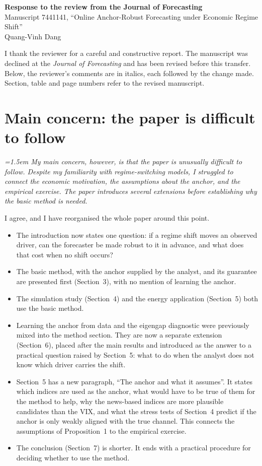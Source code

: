 \documentclass[12pt]{article}
\newenvironment{reviewer}{\par\begingroup\itshape\color{black!70}\leftskip=1.5em}{\par\endgroup}
\begin{document}
\begin{center}
{\large\bfseries Response to the review from the Journal of Forecasting}\\[4pt]
Manuscript 7441141, ``Online Anchor-Robust Forecasting under Economic Regime Shift''\\[2pt]
Quang-Vinh Dang
\end{center}

I thank the reviewer for a careful and constructive report. The manuscript was
declined at the \textit{Journal of Forecasting} and has been revised before this
transfer. Below, the reviewer's comments are in italics, each followed by the change
made. Section, table and page numbers refer to the revised manuscript.

\section*{Main concern: the paper is difficult to follow}

\begin{reviewer}
My main concern, however, is that the paper is unusually difficult to follow.
Despite my familiarity with regime-switching models, I struggled to connect the
economic motivation, the assumptions about the anchor, and the empirical exercise.
The paper introduces several extensions before establishing why the basic method is
needed.
\end{reviewer}

I agree, and I have reorganised the whole paper around this point.
\begin{itemize}
\item The introduction now states one question: if a regime shift moves an observed
driver, can the forecaster be made robust to it in advance, and what does that cost
when no shift occurs?
\item The basic method, with the anchor supplied by the analyst, and its guarantee are
presented first (Section~3), with no mention of learning the anchor.
\item The simulation study (Section~4) and the energy application (Section~5) both use
the basic method.
\item Learning the anchor from data and the eigengap diagnostic were previously mixed
into the method section. They are now a separate extension (Section~6), placed after
the main results and introduced as the answer to a practical question raised by
Section~5: what to do when the analyst does not know which driver carries the shift.
\item Section~5 has a new paragraph, ``The anchor and what it assumes''. It states which
indices are used as the anchor, what would have to be true of them for the method to
help, why the news-based indices are more plausible candidates than the VIX, and what
the stress tests of Section~4 predict if the anchor is only weakly aligned with the
true channel. This connects the assumptions of Proposition~1 to the empirical exercise.
\item The conclusion (Section~7) is shorter. It ends with a practical procedure for
deciding whether to use the method.
\end{itemize}
\end{document}
